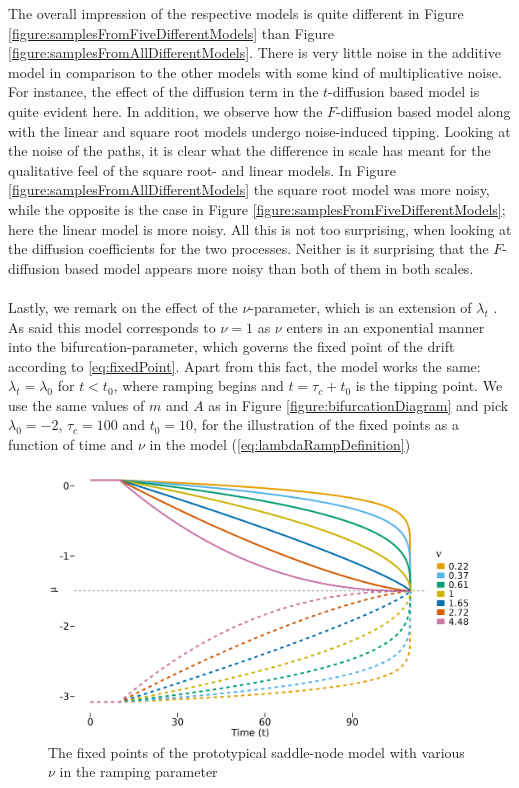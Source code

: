 The overall impression of the respective models is quite different in Figure \ref{figure:samplesFromFiveDifferentModels} than Figure \ref{figure:samplesFromAllDifferentModels}. There is very little noise in the additive model in comparison to the other models with some kind of multiplicative noise. For instance, the effect of the diffusion term in the $t$-diffusion based model is quite evident here. In addition, we observe how the $F$-diffusion based model along with the linear and square root models undergo noise-induced tipping. Looking at the noise of the paths, it is clear what the difference in scale has meant for the qualitative feel of the square root- and linear models. In Figure \ref{figure:samplesFromAllDifferentModels} the square root model was more noisy, while the opposite is the case in Figure \ref{figure:samplesFromFiveDifferentModels}; here the linear model is more noisy. All this is not too surprising, when looking at the diffusion coefficients for the two processes. Neither is it surprising that the $F$-diffusion based model appears more noisy than both of them in both scales.\\\\
Lastly, we remark on the effect of the $\nu$-parameter, which is an extension of $\lambda_t$ \cite[equation (2)]{Ditlevsen2023}. As said this model corresponds to $\nu = 1$ as $\nu$ enters in an exponential manner into the bifurcation-parameter, which governs the fixed point of the drift according to \ref{eq:fixedPoint}. Apart from this fact, the model works the same: $\lambda_t = \lambda_0$ for $t<t_0$, where ramping begins and $t=\tau_c + t_0$ is the tipping point. We use the same values of $m$ and $A$ as in Figure \ref{figure:bifurcationDiagram} and pick $\lambda_0 = -2$, $\tau_c = 100$ and $t_0 = 10$, for the illustration of the fixed points as a function of time and $\nu$ in the model (\ref{eq:lambdaRampDefinition})
\begin{figure}[h!]
    \begin{center}
        \includegraphics[scale = .1]{figures/nu_plot.jpeg}
        \caption{The fixed points of the prototypical saddle-node model with various $\nu$ in the ramping parameter}
        \label{figure:nu_plot}    
    \end{center}
\end{figure}\\
